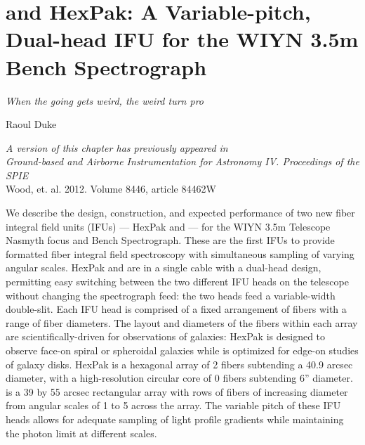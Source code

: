 \chapter[HexPak/\GP Construction]{\GP and HexPak: A Variable-pitch,
  Dual-head IFU for the WIYN 3.5m Bench Spectrograph}
\label{chap:pak_build}
\epigraph{\fixspacing\emph{When the going gets weird, the weird turn
    pro}}{Raoul Duke}


\vfill

\begin{flushright}
  \fixspacing
  \textit{A version of this chapter has previously appeared in\\
    \emph{Ground-based and Airborne Instrumentation for Astronomy IV. Proceedings of the SPIE}}\\
    \vspace{1ex}
    Wood, et. al. 2012. Volume 8446, article 84462W
\end{flushright}

\vspace{1in}

\cleardoublepage

\begin{chabstract}
  We describe the design, construction, and expected performance of
  two new fiber integral field units (IFUs) --- HexPak and \GP --- for
  the WIYN 3.5m Telescope Nasmyth focus and Bench Spectrograph.  These
  are the first IFUs to provide formatted fiber integral field
  spectroscopy with simultaneous sampling of varying angular scales.
  HexPak and \GP are in a single cable with a dual-head design,
  permitting easy switching between the two different IFU heads on the
  telescope without changing the spectrograph feed: the two heads feed
  a variable-width double-slit.  Each IFU head is comprised of a fixed
  arrangement of fibers with a range of fiber diameters.  The layout
  and diameters of the fibers within each array are
  scientifically-driven for observations of galaxies: HexPak is
  designed to observe face-on spiral or spheroidal galaxies while \GP
  is optimized for edge-on studies of galaxy disks.  HexPak is a
  hexagonal array of 2 fibers subtending a 40.9 arcsec
  diameter, with a high-resolution circular core of 0 fibers
  subtending 6'' diameter.  \GP is a 39 by 55 arcsec rectangular
  array with rows of fibers of increasing diameter from angular scales
  of 1  to 5 across the array.  The variable pitch of
  these IFU heads allows for adequate sampling of light profile
  gradients while maintaining the photon limit at different scales.
\end{chabstract}
\cleardoublepage

